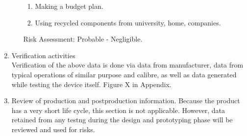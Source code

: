 \documentclass{article}[10pt]
\begin{document}
\begin{enumerate}
\begin{enumerate}
\begin{enumerate}
            \item Making a budget plan.
            \item Using recycled components from university, home, companies.
        \end{enumerate}
        Risk Assessment: Probable - Negligible.
    \end{enumerate}
    \item Verification activities\\ 
    Verification of the above data is done via data from manufacturer, data from typical operations of similar purpose and calibre, as well as data generated while testing the device itself.
    Figure X in Appendix.
    \item Review of production and postproduction information. 
    Because the product has a very short life cycle, this section is not applicable. However, data retained from any testng during the design and
    prototyping phase will be reviewed and used for risks.



\end{enumerate}    
\end{document}
